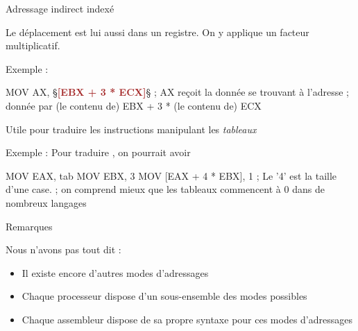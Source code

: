 \documentclass[14pt]{beamer}
\begin{document}
\begin{frame}[fragile]{Adressage indirect indexé}

Le déplacement est lui aussi dans un registre. On y applique un facteur multiplicatif.

\bigskip
Exemple :
\begin{Asm}
	MOV AX, §\textcolor{brown}{\textbf{[EBX + 3 * ECX]}}§    ; AX reçoit la donnée se trouvant à l'adresse
	                     ; donnée par (le contenu de) EBX + 3 * (le contenu de) ECX 
\end{Asm}

\bigskip
Utile pour traduire les instructions manipulant les \emph{tableaux}

\bigskip
Exemple : Pour traduire , on pourrait avoir
\begin{Asm}
	MOV EAX, tab               
	MOV EBX,  3 
	MOV [EAX + 4 * EBX], 1         ; Le '4' est la taille d'une case.
	; on comprend mieux que les tableaux commencent à 0 dans de nombreux langages
\end{Asm}
\end{frame}

\begin{frame}[fragile]{Remarques}

Nous n'avons pas tout dit :
\begin{itemize}
\item Il existe encore d'autres modes d'adressages
\item Chaque processeur dispose d'un sous-ensemble des modes possibles
\item Chaque assembleur dispose de sa propre syntaxe pour ces modes d'adressages
\end{itemize}
\end{frame}

\end{document}
